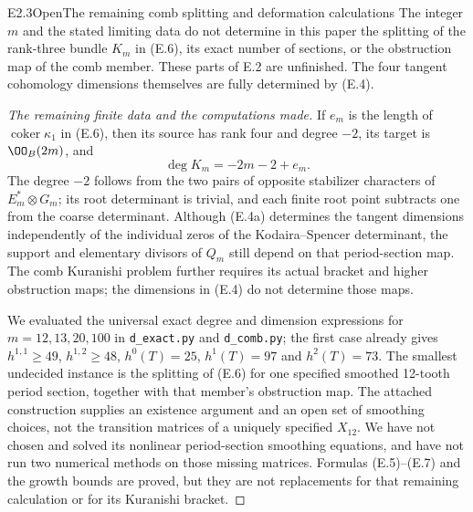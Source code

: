 \begin{claim}{E2.3}{Open}{The remaining comb splitting and deformation calculations}
The integer $m$ and the stated limiting data do not determine in
this paper the splitting of the rank-three bundle $K_m$ in (E.6),
its exact number of sections, or the obstruction map of the comb
member. These parts of E.2 are unfinished. The four tangent
cohomology dimensions themselves are fully determined by (E.4).
\end{claim}
\begin{proof}[The remaining finite data and the computations made]
If $e_m$ is the length of $\operatorname{coker}\kappa_1$ in (E.6),
then its source has rank four and degree $-2$, its target is
$\OO_B(2m)$, and
\[
 \deg K_m=-2m-2+e_m.                                  \tag{E.7}
\]
The degree $-2$ follows from the two pairs of opposite stabilizer
characters of $E_m^*\otimes G_m$; its root determinant is trivial,
and each finite root point subtracts one from the coarse determinant.
Although (E.4a) determines the tangent dimensions independently of
the individual zeros of the Kodaira--Spencer determinant, the
support and elementary divisors of $Q_m$ still depend on that
period-section map. The comb Kuranishi problem further requires
its actual bracket and higher obstruction maps; the dimensions in
(E.4) do not determine those maps.

We evaluated the universal exact degree and dimension expressions
for $m=12,13,20,100$ in \texttt{d\_exact.py} and
\texttt{d\_comb.py}; the first case already
gives $h^{1,1}\ge49$, $h^{1,2}\ge48$, $h^0(T)=25$,
$h^1(T)=97$ and $h^2(T)=73$. The smallest undecided instance
is the splitting of (E.6) for one specified smoothed 12-tooth period
section, together with that member's obstruction map. The
attached construction supplies an existence argument and an open
set of smoothing choices, not the transition matrices of a uniquely
specified $X_{12}$. We have not chosen and solved its nonlinear
period-section smoothing equations, and have not run two numerical
methods on those missing matrices. Formulas (E.5)--(E.7) and the
growth bounds are proved, but they are not replacements for that
remaining calculation or for its Kuranishi bracket.
\end{proof}

